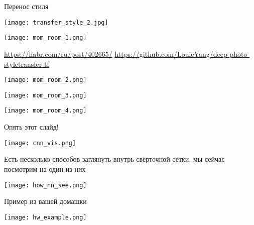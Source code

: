 \documentclass[notes,12pt, aspectratio=169]{beamer}
\begin{document}
\begin{frame}{Перенос стиля}
\begin{center}
\texttt{[image: transfer\_style\_2.jpg]}
\end{center}
\end{frame}


\begin{frame}
\begin{center}
\texttt{[image: mom\_room\_1.png]}
\end{center}

\vfill
\footnotesize
{\color{blue} \url{https://habr.com/ru/post/402665/}} \newline 
{\color{blue} \url{https://github.com/LouieYang/deep-photo-styletransfer-tf}} 
\end{frame}


\begin{frame}
\begin{center}
\texttt{[image: mom\_room\_2.png]}
\end{center}
\end{frame}


\begin{frame}
\begin{center}
\texttt{[image: mom\_room\_3.png]}
\end{center}
\end{frame}


\begin{frame}
\begin{center}
\texttt{[image: mom\_room\_4.png]}
\end{center}
\end{frame}


\begin{frame}{Опять этот слайд!}
\begin{center}
\texttt{[image: cnn\_vis.png]}
\end{center}

Есть несколько способов заглянуть внутрь свёрточной сетки, мы сейчас посмотрим на один из них
\end{frame}

\begin{frame}
\begin{center}
\texttt{[image: how\_nn\_see.png]}
\end{center}
\end{frame}


\begin{frame}{Пример из вашей домашки}
\begin{center}
\texttt{[image: hw\_example.png]}
\end{center}
\end{frame}
\end{document}
